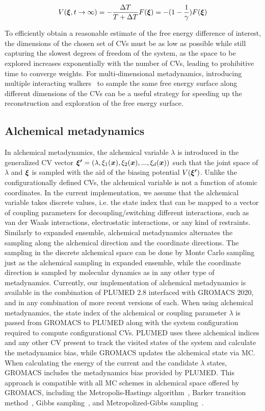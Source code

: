 \documentclass[journal=jacsat,manuscript=article]{achemso}
\newcommand{\bfv}[1]{{\mbox{\boldmath{$#1$}}}}
\newcommand{\x}{\bfv{x}}
\begin{document}
\begin{equation}
    V(\bfv{\xi}, t \rightarrow \infty)=-\frac{\Delta T}{T + \Delta T}F(\bfv{\xi})=-(1-\frac{1}{\gamma})F(\bfv{\xi})
\end{equation}

To efficiently obtain a reasonable estimate of the free energy difference of interest, the dimensions of the chosen set of CVs must be as low as possible while still capturing the slowest degrees of freedom of the system, as the space to be explored increases exponentially with the number of CVs, leading to prohibitive time to converge weights. For multi-dimensional metadynamics, introducing multiple interacting walkers~\cite{multi-metaD} to sample the same free energy surface along different dimensions of the CVs can be a useful strategy for speeding up the reconstruction and exploration of the free energy surface.  

\subsection{Alchemical metadynamics}
In alchemical metadynamics, the alchemical variable $\lambda$ is introduced in the generalized CV vector $\bfv{\xi'}=(\lambda, \xi_{1}(\x), \xi_{2}(\x), ..., \xi_{d}(\x))$ such that the joint space of $\lambda$ and $\bfv{\xi}$ is sampled with the aid of the biasing potential $V(\bfv{\xi'})$. Unlike the configurationally defined CVs, the alchemical variable is not a function of atomic coordinates. In the current implementation, we assume that the alchemical variable takes discrete values, i.e. the state index that can be mapped to a vector of coupling parameters for decoupling/switching different interactions, such as van der Waals interactions, electrostatic interactions, or any kind of restraints. Similarly to expanded ensemble, alchemical metadynamics alternates the sampling along the alchemical direction and the coordinate directions. The sampling in the discrete alchemical space can be done by Monte Carlo sampling just as the alchemical sampling in expanded ensemble, while the coordinate direction is sampled by molecular dynamics as in any other type of metadynamics. Currently, our implementation of alchemical metadynamics is available in the combination of PLUMED 2.8 interfaced with GROMACS 2020, and in any combination of more recent versions of each. When using alchemical metadynamics, the state index of the alchemical or coupling parameter $\lambda$ is passed from GROMACS to PLUMED along with the system configuration required to compute configurational CVs. PLUMED uses these alchemical indices and any other CV present to track the visited states of the system and calculate the metadynamics bias, while GROMACS updates the alchemical state via MC. When calculating the energy of the current and the candidate $\lambda$ states, GROMACS includes the metadynamics bias provided by PLUMED. This approach is compatible with all MC schemes in alchemical space offered by GROMACS, including the Metropolis-Hastings algorithm~\cite{hastings1970monte}, Barker transition method~\cite{barker1965monte}, Gibbs sampling~\cite{geman1984stochastic, liu2001monte}, and Metropolized-Gibbs sampling~\cite{liu1996peskun, chodera2016simple}.
\end{document}
